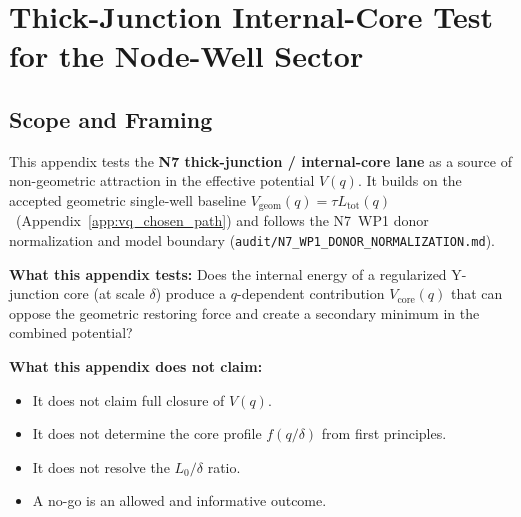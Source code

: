 
\chapter{Thick-Junction Internal-Core Test for the Node-Well Sector}
\label{app:P2_N7_core}

\section{Scope and Framing}
\label{sec:P2N7:scope}

This appendix tests the \textbf{N7 thick-junction / internal-core lane}
as a source of non-geometric attraction in the effective potential $V(q)$.
It builds on the accepted geometric single-well baseline
$V_{\mathrm{geom}}(q) = \tau L_{\mathrm{tot}}(q)$ \tagDc\
(Appendix~\ref{app:vq_chosen_path}) and follows the N7~WP1 donor
normalization and model boundary
(\texttt{audit/N7\_WP1\_DONOR\_NORMALIZATION.md}).

\textbf{What this appendix tests:}
Does the internal energy of a regularized Y-junction core (at scale
$\delta$) produce a $q$-dependent contribution $V_{\mathrm{core}}(q)$
that can oppose the geometric restoring force and create a secondary
minimum in the combined potential?

\textbf{What this appendix does not claim:}
\begin{itemize}
    \item It does not claim full closure of $V(q)$.
    \item It does not determine the core profile $f(q/\delta)$
          from first principles.
    \item It does not resolve the $L_0/\delta$ ratio.
    \item A no-go is an allowed and informative outcome.
\end{itemize}

